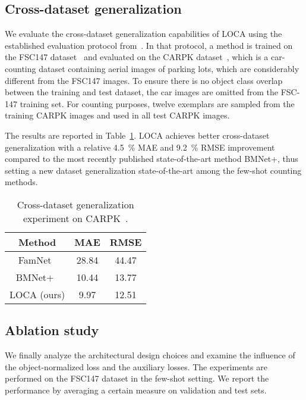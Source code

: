 \documentclass[10pt,twocolumn,letterpaper]{article}
\newcommand*\circledd[1]{\tikz[baseline=(char.base)]{
            \node[shape=circle,draw,inner sep=0.15pt] (char) {#1};}}
\newcommand{\first}[1]{{#1\raisebox{0.8pt}{\footnotesize \color{gold} \circledd{1}}}}
\newcommand{\second}[1]{{#1\raisebox{0.8pt}{\footnotesize \color{silver} \circledd{2}}}}
\newcommand{\third}[1]{{#1\raisebox{0.8pt}{\footnotesize \color{bronze} \circledd{3}}}}
\begin{document}
\subsection{Cross-dataset generalization}
\label{sec:cross_dataset}

We evaluate the cross-dataset generalization capabilities of LOCA using the established evaluation protocol from~\cite{famnet}. In that protocol, a method is trained on the FSC147 dataset~\cite{famnet} and evaluated on the CARPK dataset~\cite{carpk}, which is a car-counting dataset containing aerial images of parking lots, which are considerably different from the FSC147 images. To ensure there is no object class overlap between the training and test dataset, the car images are omitted from the FSC-147 training set. For counting purposes, twelve exemplars are sampled from the training CARPK images and used in all test CARPK images. 



The results are reported in Table~\ref{tab:cars}. LOCA achieves better cross-dataset generalization with a relative  4.5~\% MAE and 9.2~\% RMSE improvement compared to the most recently published state-of-the-art method BMNet+, thus setting a new dataset generalization state-of-the-art among the few-shot counting methods.

\begin{table}[htbp]
    \centering
    \begin{tabular}{c c c}
        \toprule
        Method & MAE & RMSE \\ 
        \midrule
        FamNet~\cite{famnet} & \third{28.84} & \third{44.47} \\
        BMNet+~\cite{bmnet} & \second{10.44} & \second{13.77} \\
        LOCA (ours) & \first{9.97} & \first{12.51} \\
        \bottomrule
    \end{tabular}
    \caption{Cross-dataset generalization experiment on CARPK~\cite{carpk}. 
}
    \label{tab:cars}
\end{table}

\subsection{Ablation study}
\label{sec:ablation}



We finally analyze the architectural design choices and examine the influence of the object-normalized loss and the auxiliary losses. 
The experiments are performed on the FSC147 dataset in the few-shot setting. 
We report the performance by averaging a certain measure on validation and test sets. 
\end{document}
